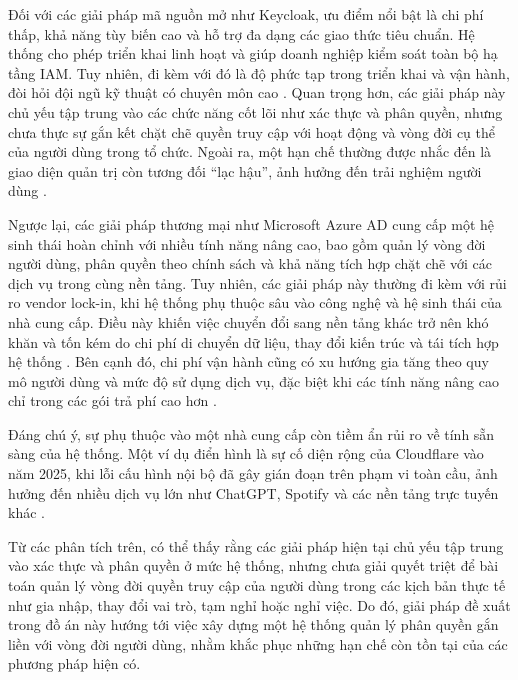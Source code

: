 \documentclass[../DoAn.tex]{subfiles}
\begin{document}
Đối với các giải pháp mã nguồn mở như Keycloak, ưu điểm nổi bật là chi phí thấp, khả năng tùy biến cao và hỗ trợ đa dạng các giao thức tiêu chuẩn. Hệ thống cho phép triển khai linh hoạt và giúp doanh nghiệp kiểm soát toàn bộ hạ tầng IAM. Tuy nhiên, đi kèm với đó là độ phức tạp trong triển khai và vận hành, đòi hỏi đội ngũ kỹ thuật có chuyên môn cao \cite{descope_keycloak_alternatives,cybersectool_keycloak,ossalt_keycloak_vs_authentik}. Quan trọng hơn, các giải pháp này chủ yếu tập trung vào các chức năng cốt lõi như xác thực và phân quyền, nhưng chưa thực sự gắn kết chặt chẽ quyền truy cập với hoạt động và vòng đời cụ thể của người dùng trong tổ chức. Ngoài ra, một hạn chế thường được nhắc đến là giao diện quản trị còn tương đối “lạc hậu”, ảnh hưởng đến trải nghiệm người dùng \cite{descope_keycloak_alternatives,cybersectool_keycloak,ossalt_keycloak_vs_authentik}.

Ngược lại, các giải pháp thương mại như Microsoft Azure AD cung cấp một hệ sinh thái hoàn chỉnh với nhiều tính năng nâng cao, bao gồm quản lý vòng đời người dùng, phân quyền theo chính sách và khả năng tích hợp chặt chẽ với các dịch vụ trong cùng nền tảng. Tuy nhiên, các giải pháp này thường đi kèm với rủi ro vendor lock-in, khi hệ thống phụ thuộc sâu vào công nghệ và hệ sinh thái của nhà cung cấp. Điều này khiến việc chuyển đổi sang nền tảng khác trở nên khó khăn và tốn kém do chi phí di chuyển dữ liệu, thay đổi kiến trúc và tái tích hợp hệ thống \cite{neontri_vendor_lock_in}. Bên cạnh đó, chi phí vận hành cũng có xu hướng gia tăng theo quy mô người dùng và mức độ sử dụng dịch vụ, đặc biệt khi các tính năng nâng cao chỉ trong các gói trả phí cao hơn \cite{neontri_vendor_lock_in}.

Đáng chú ý, sự phụ thuộc vào một nhà cung cấp còn tiềm ẩn rủi ro về tính sẵn sàng của hệ thống. Một ví dụ điển hình là sự cố diện rộng của Cloudflare vào năm 2025, khi lỗi cấu hình nội bộ đã gây gián đoạn trên phạm vi toàn cầu, ảnh hưởng đến nhiều dịch vụ lớn như ChatGPT, Spotify và các nền tảng trực tuyến khác \cite{cloudflare_outage_2025}.

Từ các phân tích trên, có thể thấy rằng các giải pháp hiện tại chủ yếu tập trung vào xác thực và phân quyền ở mức hệ thống, nhưng chưa giải quyết triệt để bài toán quản lý vòng đời quyền truy cập của người dùng trong các kịch bản thực tế như gia nhập, thay đổi vai trò, tạm nghỉ hoặc nghỉ việc. Do đó, giải pháp đề xuất trong đồ án này hướng tới việc xây dựng một hệ thống quản lý phân quyền gắn liền với vòng đời người dùng, nhằm khắc phục những hạn chế còn tồn tại của các phương pháp hiện có.
\end{document}
